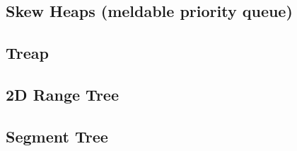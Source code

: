 %


%

\subsection{Skew Heaps (meldable priority queue)}


\subsection{Treap}


\subsection{2D Range Tree}


\subsection{Segment Tree}

